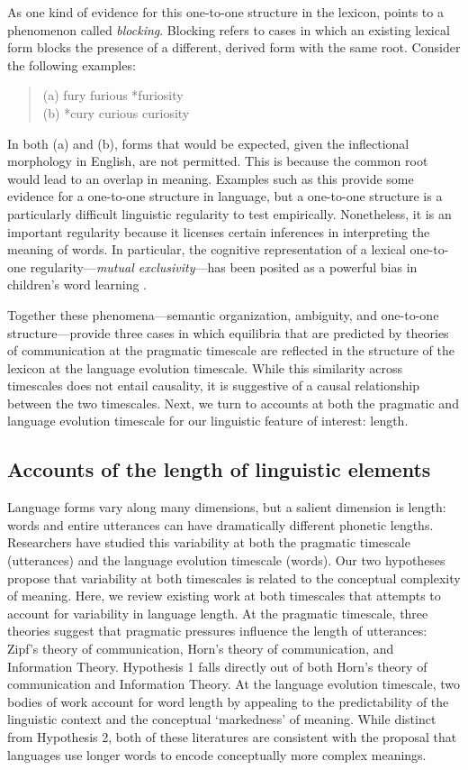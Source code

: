 \documentclass[man]{apa2}
\begin{document}
As one kind of evidence for this one-to-one structure in the lexicon,  points to a phenomenon called {\it blocking}. Blocking refers to cases in which an existing lexical form blocks the presence of a different, derived form with the same root. Consider the following examples:
 \begin{quote}
 	(a) fury furious *furiosity\\
	(b) *cury curious curiosity
\end{quote}
In both (a) and (b), forms that would be expected, given the inflectional morphology in English, are not permitted. This is because the common root would lead to an overlap in meaning. Examples such as this provide some evidence for a one-to-one structure in language, but a one-to-one structure is a particularly difficult linguistic regularity to test empirically. Nonetheless, it is an important regularity because it licenses certain inferences in interpreting the meaning of words. In particular, the cognitive representation of a lexical one-to-one regularity---{\it mutual exclusivity}---has been posited as a powerful bias in children's word learning \cite{markman1988, markman2003}.

Together these phenomena---semantic organization, ambiguity, and one-to-one structure---provide three cases in which equilibria that are predicted by theories of communication at the pragmatic timescale are reflected in the structure of the lexicon at the language evolution timescale. While this similarity across timescales does not entail causality, it is suggestive of a causal relationship between the two timescales. Next, we turn to accounts at both the pragmatic and language evolution timescale for our linguistic feature of interest: length.

\subsection{Accounts of the length of linguistic elements}

Language forms vary along many dimensions, but a salient dimension is length: words and entire utterances can have dramatically different phonetic lengths. Researchers have studied this variability at both the pragmatic timescale (utterances) and the language evolution timescale (words). Our two hypotheses propose that variability at both timescales is related to the conceptual complexity of meaning. Here, we review existing work at both timescales that attempts to account for variability in language length. At the pragmatic timescale, three theories suggest that pragmatic pressures influence the length of utterances: Zipf's theory of communication, Horn's theory of communication, and Information Theory. Hypothesis 1 falls directly out of both Horn's theory of communication and Information Theory. At the language evolution timescale, two bodies of work account for word length by appealing to the predictability of the linguistic context and the conceptual `markedness' of meaning. While distinct from Hypothesis 2, both of these literatures are consistent with the proposal that languages use longer words to encode conceptually more complex meanings.
\end{document}
